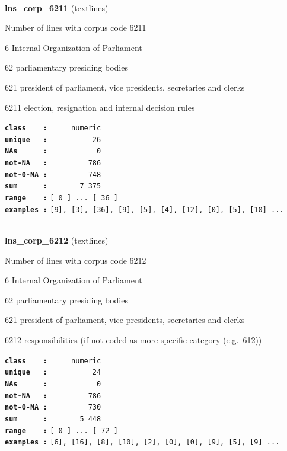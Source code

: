 \documentclass[]{article}
\begin{document}
~

\textbf{lns\_corp\_6211} (textlines)

Number of lines with corpus code 6211

6 Internal Organization of Parliament

62 parliamentary presiding bodies

621 president of parliament, vice presidents, secretaries and clerks

6211 election, resignation and internal decision rules

\textbf{\texttt{class\ \ \ \ :}} \texttt{~~~~~numeric}\\
\textbf{\texttt{unique\ \ \ :}} \texttt{~~~~~~~~~~26}\\
\textbf{\texttt{NAs\ \ \ \ \ \ :}} \texttt{~~~~~~~~~~~0}\\
\textbf{\texttt{not-NA\ \ \ :}} \texttt{~~~~~~~~~786}\\
\textbf{\texttt{not-0-NA\ :}} \texttt{~~~~~~~~~748}\\
\textbf{\texttt{sum\ \ \ \ \ \ :}} \texttt{~~~~~~~7~375}\\
\textbf{\texttt{range\ \ \ \ :}}
\texttt{{[}\ 0\ {]}\ ...\ {[}\ 36\ {]}}\\
\textbf{\texttt{examples\ :}}
\texttt{{[}9{]},\ {[}3{]},\ {[}36{]},\ {[}9{]},\ {[}5{]},\ {[}4{]},\ {[}12{]},\ {[}0{]},\ {[}5{]},\ {[}10{]}\ ...}\\

~

\textbf{lns\_corp\_6212} (textlines)

Number of lines with corpus code 6212

6 Internal Organization of Parliament

62 parliamentary presiding bodies

621 president of parliament, vice presidents, secretaries and clerks

6212 responsibilities (if not coded as more specific category
(e.g.~612))

\textbf{\texttt{class\ \ \ \ :}} \texttt{~~~~~numeric}\\
\textbf{\texttt{unique\ \ \ :}} \texttt{~~~~~~~~~~24}\\
\textbf{\texttt{NAs\ \ \ \ \ \ :}} \texttt{~~~~~~~~~~~0}\\
\textbf{\texttt{not-NA\ \ \ :}} \texttt{~~~~~~~~~786}\\
\textbf{\texttt{not-0-NA\ :}} \texttt{~~~~~~~~~730}\\
\textbf{\texttt{sum\ \ \ \ \ \ :}} \texttt{~~~~~~~5~448}\\
\textbf{\texttt{range\ \ \ \ :}}
\texttt{{[}\ 0\ {]}\ ...\ {[}\ 72\ {]}}\\
\textbf{\texttt{examples\ :}}
\texttt{{[}6{]},\ {[}16{]},\ {[}8{]},\ {[}10{]},\ {[}2{]},\ {[}0{]},\ {[}0{]},\ {[}9{]},\ {[}5{]},\ {[}9{]}\ ...}\\
\end{document}
